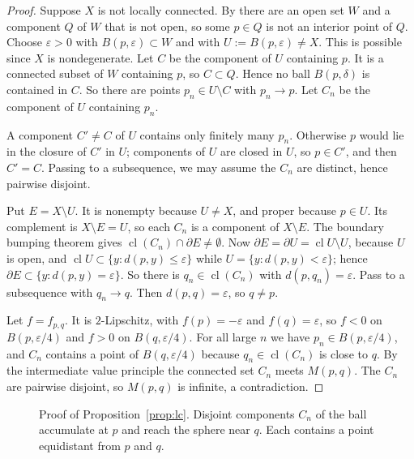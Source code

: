 \documentclass[11pt]{amsart}
\theoremstyle{definition}
\theoremstyle{remark}
\newcommand{\M}{M}
\newcommand{\cl}{\operatorname{cl}}
\begin{document}
\begin{proof}
Suppose $X$ is not locally connected. By \cite[Theorem~25.3]{Mun00} there are an open set $W$ and a component $Q$ of $W$ that is not open, so some $p\in Q$ is not an interior point of $Q$. Choose $\varepsilon>0$ with $B(p,\varepsilon)\subset W$ and with $U:=B(p,\varepsilon)\ne X$. This is possible since $X$ is nondegenerate. Let $C$ be the component of $U$ containing $p$. It is a connected subset of $W$ containing $p$, so $C\subset Q$. Hence no ball $B(p,\delta)$ is contained in $C$. So there are points $p_n\in U\setminus C$ with $p_n\to p$. Let $C_n$ be the component of $U$ containing $p_n$.

A component $C'\neq C$ of $U$ contains only finitely many $p_n$. Otherwise $p$ would lie in the closure of $C'$ in $U$; components of $U$ are closed in $U$, so $p\in C'$, and then $C'=C$. Passing to a subsequence, we may assume the $C_n$ are distinct, hence pairwise disjoint.

Put $E=X\setminus U$. It is nonempty because $U\ne X$, and proper because $p\in U$. Its complement is $X\setminus E=U$, so each $C_n$ is a component of $X\setminus E$. The boundary bumping theorem \cite[Theorem~5.6]{Nad92} gives $\cl(C_n)\cap\partial E\ne\emptyset$. Now $\partial E=\partial U=\cl U\setminus U$, because $U$ is open, and $\cl U\subset\{y:d(p,y)\le\varepsilon\}$ while $U=\{y:d(p,y)<\varepsilon\}$; hence $\partial E\subset\{y:d(p,y)=\varepsilon\}$. So there is $q_n\in\cl(C_n)$ with $d(p,q_n)=\varepsilon$. Pass to a subsequence with $q_n\to q$. Then $d(p,q)=\varepsilon$, so $q\ne p$.

Let $f=f_{p,q}$. It is $2$-Lipschitz, with $f(p)=-\varepsilon$ and $f(q)=\varepsilon$, so $f<0$ on $B(p,\varepsilon/4)$ and $f>0$ on $B(q,\varepsilon/4)$. For all large $n$ we have $p_n\in B(p,\varepsilon/4)$, and $C_n$ contains a point of $B(q,\varepsilon/4)$ because $q_n\in\cl(C_n)$ is close to $q$. By the intermediate value principle the connected set $C_n$ meets $\M(p,q)$. The $C_n$ are pairwise disjoint, so $\M(p,q)$ is infinite, a contradiction.
\end{proof}

\begin{figure}[ht]
\centering
{}
\caption{Proof of Proposition~\ref{prop:lc}. Disjoint components $C_n$ of the ball accumulate at $p$ and reach the sphere near $q$. Each contains a point equidistant from $p$ and $q$.}\label{fig:lc}
\end{figure}
\end{document}

